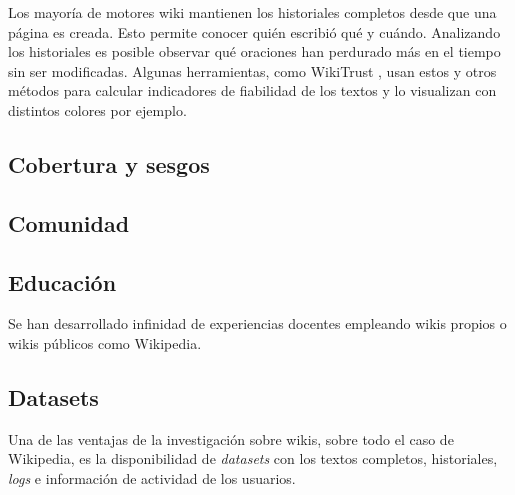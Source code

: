\documentclass[11pt,onecolumn]{article}
\begin{document}
Los mayoría de motores wiki mantienen los historiales completos desde que una página es creada. Esto permite conocer quién escribió qué y cuándo. Analizando los historiales es posible observar qué oraciones han perdurado más en el tiempo sin ser modificadas. Algunas herramientas, como WikiTrust \citep{adler2008}, usan estos y otros métodos para calcular indicadores de fiabilidad de los textos y lo visualizan con distintos colores por ejemplo.

\subsection{Cobertura y sesgos}





\subsection{Comunidad}



\subsection{Educación}




Se han desarrollado infinidad de experiencias docentes empleando wikis propios o wikis públicos como Wikipedia.

\subsection{Datasets}


Una de las ventajas de la investigación sobre wikis, sobre todo el caso de Wikipedia, es la disponibilidad de \emph{datasets} con los textos completos, historiales, \emph{logs} e información de actividad de los usuarios.
\end{document}
